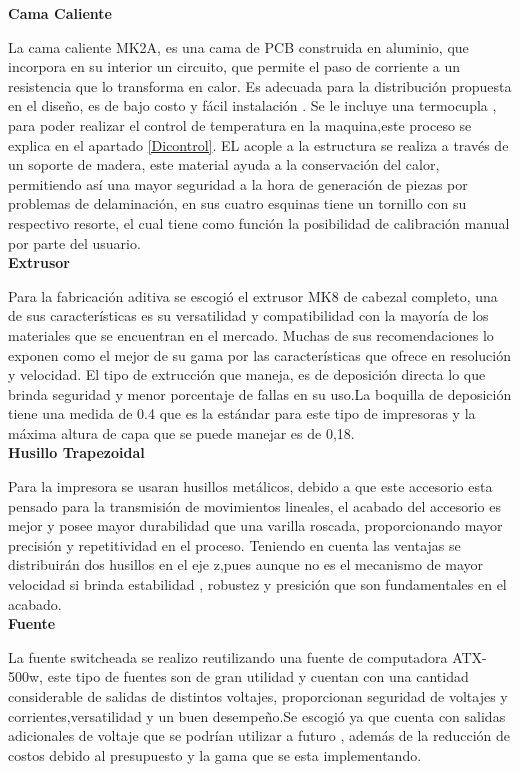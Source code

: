 \textbf{Cama Caliente}

La cama caliente MK2A, es una cama de PCB construida en aluminio, que incorpora en su interior un circuito, que permite el paso de corriente a un resistencia que lo transforma en calor. Es adecuada para la  distribución propuesta en el diseño, es de bajo costo y fácil instalación . Se le incluye una termocupla , para poder realizar el control de temperatura en la maquina,este proceso se explica en el apartado \autoref{Dicontrol}. EL acople a la estructura se realiza a través de un soporte de madera, este material ayuda a la conservación del calor, permitiendo así una mayor seguridad a la hora de generación de piezas por problemas de  delaminación, en sus cuatro esquinas tiene un tornillo con su respectivo resorte, el cual tiene como función la posibilidad de calibración manual por parte del usuario.\\



\textbf{Extrusor} 

Para la fabricación aditiva se escogió el extrusor MK8 de cabezal completo, una de sus características es su versatilidad  y compatibilidad con la mayoría de los materiales que se encuentran en el mercado. Muchas de sus recomendaciones lo exponen como el mejor de su gama por las características que ofrece en resolución y velocidad. El tipo de extrucción que maneja, es de deposición directa lo que brinda seguridad y menor porcentaje de fallas en su uso.La boquilla de deposición tiene una medida de 0.4 que es la estándar para este tipo de impresoras y la máxima altura de capa que se puede manejar es de 0,18. \\


\textbf{Husillo Trapezoidal}

Para la impresora se usaran husillos metálicos, debido a que este accesorio esta pensado para la transmisión de movimientos lineales, el acabado del accesorio es mejor y posee mayor durabilidad que una varilla roscada, proporcionando mayor precisión y repetitividad en el proceso. Teniendo en cuenta las ventajas se distribuirán dos husillos en el eje z,pues aunque no es el mecanismo de mayor velocidad si brinda estabilidad , robustez y presición que son fundamentales en el acabado.\\



\textbf{Fuente}

La fuente switcheada se realizo reutilizando una fuente de computadora ATX-500w, este tipo de fuentes son de gran utilidad y cuentan con una cantidad considerable de salidas de distintos voltajes, proporcionan seguridad de voltajes y corrientes,versatilidad y un buen desempeño.Se escogió ya que cuenta con salidas adicionales de voltaje que se podrían utilizar a futuro , además de la reducción de costos debido al presupuesto y la gama que se esta implementando.\\


